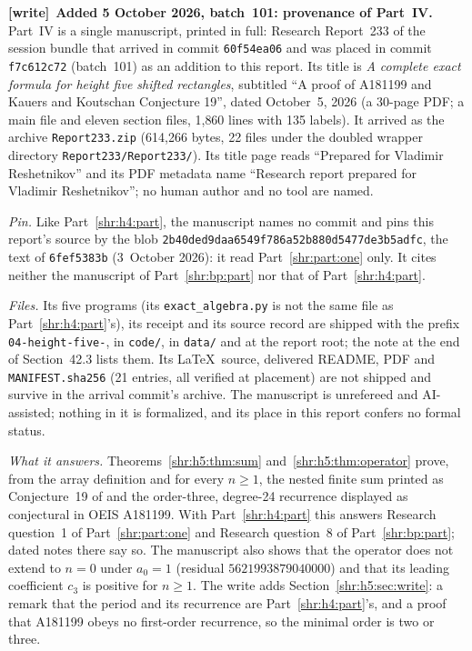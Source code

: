 \documentclass[11pt,letterpaper]{article}
\numberwithin{equation}{section}
\theoremstyle{definition}
\newcommand{\1}{\mathbf 1}
\newenvironment{writenote}[1][]{\par\smallskip\begingroup\small
 \noindent\textbf{[write]}\if\relax\detokenize{#1}\relax\else~\textbf{#1.}\fi\ }%
 {\par\endgroup\smallskip}
\begin{document}
\begin{writenote}[Added 5 October 2026, batch~101: provenance of Part~IV]
Part~IV is a single manuscript, printed in full: Research Report~233 of
the session bundle that arrived in commit \texttt{60f54ea06} and was placed
in commit \texttt{f7c612c72} (batch~101) as an addition to this report.
Its title is \emph{A complete exact formula for height five shifted
rectangles}, subtitled ``A proof of A181199 and Kauers and Koutschan
Conjecture 19'', dated October~5, 2026 (a 30-page PDF; a main file and
eleven section files, 1{,}860 lines with 135 labels). It arrived as the
archive \texttt{Report233.zip} (614{,}266 bytes, 22 files under the doubled
wrapper directory \texttt{Report233/\allowbreak Report233/}). Its title page
reads ``Prepared for Vladimir Reshetnikov'' and its PDF metadata name
``Research report prepared for Vladimir Reshetnikov''; no human author and
no tool are named.

\emph{Pin.} Like Part~\ref{shr:h4:part}, the manuscript names no commit and
pins this report's source by the blob
\texttt{2b40ded9\allowbreak daa6549f\allowbreak 786a52b8\allowbreak 80d5477d\allowbreak e3b5adfc}, the text of
\texttt{6fef5383b} (3~October 2026): it read Part~\ref{shr:part:one} only.
It cites neither the manuscript of Part~\ref{shr:bp:part} nor that of
Part~\ref{shr:h4:part}.

\emph{Files.} Its five programs (its \texttt{exact\_algebra.py} is not the
same file as Part~\ref{shr:h4:part}'s), its receipt and its source record
are shipped with the prefix \texttt{04-height-five-}, in \texttt{code/}, in
\texttt{data/} and at the report root; the note at the end of
Section~42.3 lists them. Its \LaTeX\ source,
delivered README, PDF and \texttt{MANIFEST.sha256} (21 entries, all verified
at placement) are not shipped and survive in the arrival commit's archive.
The manuscript is unrefereed and AI-assisted; nothing in it is formalized,
and its place in this report confers no formal status.

\emph{What it answers.} Theorems~\ref{shr:h5:thm:sum}
and~\ref{shr:h5:thm:operator} prove, from the array definition and for
every $n\ge1$, the nested finite sum printed as Conjecture~19 of
\cite{KK} and the order-three, degree-24 recurrence displayed as
conjectural in OEIS A181199. With Part~\ref{shr:h4:part} this answers
Research question~1 of Part~\ref{shr:part:one} and Research question~8 of
Part~\ref{shr:bp:part}; dated notes there say so. The manuscript also shows
that the operator does not extend to $n=0$ under $a_0=1$ (residual
$5621993879040000$) and that its leading coefficient $c_3$ is positive for
$n\ge1$. The write adds Section~\ref{shr:h5:sec:write}: a remark that the
period and its recurrence are Part~\ref{shr:h4:part}'s, and a proof that
A181199 obeys no first-order recurrence, so the minimal order is two or
three.


\end{writenote}
\end{document}
